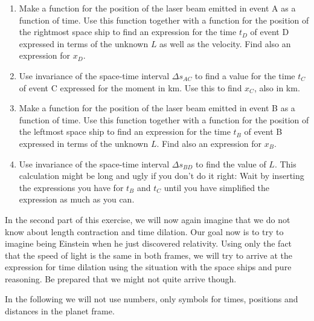 {\begin{multicols}{2}
\begin{enumerate}
\item Make a function for the position of the laser beam emitted in event A as a function of time. Use this function together with a function for the position of the rightmost space ship to find an expression for the time $t_D$ of event D expressed in terms of the unknown $L$ as well as the velocity. Find also an expression for $x_D$.
\item Use invariance of the space-time interval $\Delta s_{AC}$ to find a value for the time $t_C$ of event C expressed for the moment in km. Use this to find $x_C$, also in km.
\item  Make a function for the position of the laser beam emitted in event B as a function of time. Use this function together with a function for the position of the leftmost space ship to find an expression for the time $t_B$ of event B expressed in terms of the unknown $L$. Find also an expression for $x_B$.
\item Use invariance of the space-time interval $\Delta s_{BD}$ to
find the value of $L$. This calculation might be long and ugly if you
don't do it right: Wait by inserting the expressions you have for
$t_B$ and $t_C$ until you have simplified the expression as much as
you can.
\end{enumerate}

In the second part of this exercise, we will now again imagine that we
do not know about length contraction and time dilation. Our goal now
is to try to imagine being Einstein when he just discovered
relativity. Using only the fact that the speed of light is the same in
both frames, we will try to arrive at the expression for time dilation
using the situation with the space ships and pure reasoning. Be
prepared that we might not quite arrive though.

In the following we will not use numbers, only symbols for times,
positions and distances in the planet frame.

\begin{enumerate}


\end{enumerate}
\end{multicols}}
